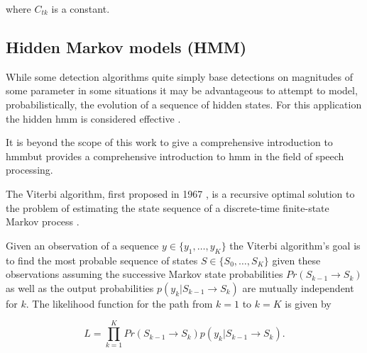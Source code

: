 where $C_{tk}$ is a constant.

\subsection{Hidden Markov models (HMM)}
While some detection algorithms quite simply base detections on magnitudes of some parameter \cite{Subramanya2007}\cite{Sugiyama2007}\DIFaddbegin \DIFadd{, }\DIFaddend in some situations it may be advantageous to attempt to model, probabilistically, the evolution of a sequence of hidden states. For this application the hidden \DIFdelbegin {}\DIFdelend \DIFaddbegin \gls{hmm} \DIFaddend is considered effective \cite{Rabiner1989}\cite{Xu2005}.

It is beyond the scope of this work to give a comprehensive introduction to \DIFdelbegin {}\DIFdelend \DIFaddbegin \gls{hmm}\DIFaddend but \cite{Rabiner1989} provides a comprehensive introduction to \DIFdelbegin {}\DIFdelend \DIFaddbegin \gls{hmm} \DIFaddend in the field of speech processing.

The Viterbi algorithm, first proposed in 1967 \cite{Viterbi1967} \DIFaddbegin {}\DIFaddend , is a recursive optimal solution to the problem of estimating the state sequence of a discrete-time finite-state Markov process \cite{Forney1973}. \DIFdelbegin {}\DIFdelend \DIFaddbegin {}\label{corrections:viterbi}
\DIFaddend

Given an observation of a sequence $y \in \{y_1,\ldots,y_K\}$ the Viterbi algorithm's goal is to find the most probable sequence of states $S \in \{S_0,\ldots,S_K \}$ given these observations assuming the successive Markov state probabilities $Pr(S_{k-1} \rightarrow S_{k})$ as well as the output probabilities $p(y_k | S_{k-1} \rightarrow S_{k})$ are mutually independent for $k$. The likelihood function for the path from $k=1$ to $k=K$ is given by

\begin{equation}\label{eq:viterbiLitRev}
L = \prod_{k=1}^K Pr(S_{k-1} \rightarrow S_{k}) p(y_k | S_{k-1} \rightarrow S_{k}).
\end{equation}

